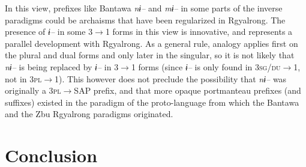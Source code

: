 \documentclass[twoside,a4paper,11pt]{article}
\newcommand{\ipa}[1]{{\phon\textit{#1}}}
\newcommand{\Σ}{\greek{Σ}}
\begin{document}
In this view, prefixes like Bantawa \ipa{nɨ--} and   \ipa{mɨ--} in some parts of the inverse paradigms could be archaisms that have been regularized in Rgyalrong. The presence of \ipa{ɨ--} in some 3$\rightarrow$1 forms in this view is innovative, and represents a parallel development with Rgyalrong. As a general rule, analogy   applies first on the plural and dual forms and only later in the singular, so it is not likely that \ipa{nɨ--} is being replaced by \ipa{ɨ--} in 3$\rightarrow$1 forms (since \ipa{ɨ--} is only found in \textsc{3sg/du}$\rightarrow$1, not in  \textsc{3pl}$\rightarrow$1). This however does not preclude the possibility that \ipa{nɨ--} was  originally a \textsc{3pl}$\rightarrow$SAP prefix, and that more opaque portmanteau prefixes (and suffixes) existed in the paradigm of the proto-language from which the Bantawa and the Zbu Rgyalrong paradigms originated.


\section{Conclusion}


 
 
\end{document}
